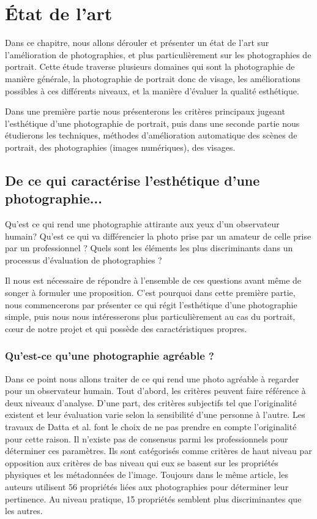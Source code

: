 \documentclass[11pt, french,screen]{report-rd-info}
\begin{document}
\chapter{\'Etat de l'art}
\label{chap:EtatArt}
Dans ce chapitre, nous allons dérouler et présenter un état de l’art sur l’amélioration de photographies, et plus particulièrement sur les photographies de portrait. Cette étude traverse plusieurs domaines qui sont la photographie de manière générale, la photographie de portrait donc de visage, les améliorations possibles à ces différents niveaux, et la manière d’évaluer la qualité esthétique.

Dans une première partie nous présenterons les critères principaux jugeant l’esthétique d’une photographie de portrait, puis dans une seconde partie nous étudierons les techniques, méthodes d’amélioration automatique des scènes de portrait, des photographies (images numériques), des visages.
\section{De ce qui caractérise l’esthétique d’une photographie...}
Qu’est ce qui rend une photographie attirante aux yeux d’un observateur humain? Qu’est ce qui va différencier la photo prise par un amateur de celle prise par un professionnel ? Quels sont les éléments les plus discriminants dans un processus d'évaluation de photographies ?

Il nous est nécessaire de répondre à l’ensemble de ces questions avant même de songer à formuler une proposition. C’est pourquoi dans cette première partie, nous commencerons par présenter ce qui régit l'esthétique d’une photographie simple, puis nous nous intéresserons plus particulièrement au cas du portrait, cœur de notre projet et qui possède des caractéristiques propres.
\subsection{Qu’est-ce qu’une photographie agréable ?}
Dans ce point nous allons traiter de ce qui rend une photo agréable à regarder pour un observateur humain. Tout d’abord, les critères peuvent faire référence à deux niveaux d'analyse.
\label{originalite}
D’une part, des critères subjectifs tel que l’originalité existent et  leur évaluation varie selon la sensibilité d’une personne à l’autre. Les travaux de Datta et al. \cite{Datta} font le choix de ne pas prendre en compte l'originalité pour cette raison.  Il n’existe pas de consensus parmi les professionnels pour déterminer ces paramètres. Ils sont catégorisés comme critères de haut niveau par opposition aux critères de bas niveau qui eux se basent sur les propriétés physiques et les métadonnées de l’image. Toujours dans le même article, les auteurs utilisent 56 propriétés liées aux photographies pour déterminer leur pertinence. Au niveau pratique, 15 propriétés semblent plus discriminantes que les autres.
\end{document}
